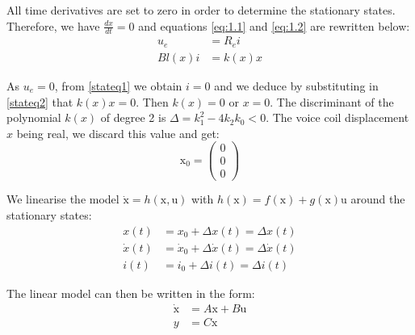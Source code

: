 All time derivatives are set to zero in order to determine the stationary states. Therefore, we have $\frac{dx}{dt} = 0$ and equations \eqref{eq:1.1} and \eqref{eq:1.2} are rewritten below:
\begin{align}
   u_{e} &= R_{e}i \label{stateq1} \\
   Bl(x)i &= k(x)x \label{stateq2}
\end{align}

As $u_{e} = 0$, from \eqref{stateq1} we obtain $i = 0$ and we deduce by substituting in \eqref{stateq2} that $k(x)x = 0$. Then $k(x) = 0$ or $x = 0$. The discriminant of the polynomial $k(x)$ of degree 2 is $\Delta = k_{1}^2-4k_{2}k_{0} < 0$. The voice coil displacement $x$ being real, we discard this value and get:
\begin{equation*}
\text{x}_{0}=
\begin{pmatrix}
  0 \\
  0 \\
  0
\end{pmatrix}
\end{equation*}

We linearise the model $\dot{\text{x}} = h(\text{x},\text{u})$ with $h(\text{x}) = f(\text{x}) + g(\text{x})\text{u}$ around the stationary states:
\begin{align*}
   x(t) &= x_{0} + \Delta x(t) = \Delta x(t)\\
   \dot{x}(t) &= \dot{x}_{0} + \Delta \dot{x}(t) = \Delta \dot{x}(t) \\
   i(t) &= i_{0} + \Delta i(t) = \Delta i(t)
\end{align*}

The linear model can then be written in the form:
\begin{align*}
   \dot{\text{x}} &= A\text{x} + B\text{u} \\
   y &= C\text{x}
\end{align*}

